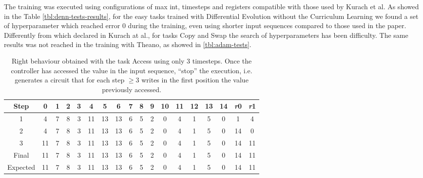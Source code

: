 \iffalse
\begin{figure}[t]
	\centering
	\begin{tikzpicture}[samples=100,smooth, scale=.875]
			\begin{axis}[
 				axis x line=center,
  				axis y line=center,
 				xlabel={Sequence A length},
  				ylabel={Error rate},
    				x label style={at={(axis description cs:0.5,-0.115)},anchor=north},
    				y label style={at={(axis description cs:-0.115,.5)},rotate=90,anchor=south},    				
			    grid=both,
			    grid style={line width=.1pt, draw=gray!10},
			    major grid style={line width=.2pt,draw=gray!50},
			    xtick={10, 20, 30 50, 100, 500, 1000},
			    xmin=0, xmax=1000,
			    ymin=0, ymax=1,
				legend style={at={(0.5,-0.25)},anchor=north}		
			]
  				\addplot table{data/swap-error-rate-CL.txt};
  				\addlegendentry{Swap CL}
			\end{axis}
	\end{tikzpicture}
	\label{fig:nram-tests-error-rate-plot}
	\caption{Error rate of best controllers in generalization tests.}
\end{figure}
\fi
The training was executed using configurations of max int, timesteps and registers compatible with those used by Kurach et al. As showed in the Table \ref{tbl:denn-tests-results}, for the easy tasks trained with Differential Evolution without the Curriculum Learning we found a set of hyperparameter which reached error 0 during the training, even using shorter input sequences compared to those used in the paper. Differently from which declared in Kurach at al., for tasks Copy and Swap the search of hyperparameters has been difficulty. The same results was not reached in the training with Theano, as showed in \ref{tbl:adam-tests}. 
\begin{table}[h]
	\centering
	\begin{tabular}{c|ccccccccccccccc|cc}
		\rowcolor{Gray}\textbf{Step} & 0 & 1 & 2 & 3 & 4 & 5 & 6 & 7 & 8 & 9 & 10 & 11 & 12 & 13 & 14 & \textit{r}0 & \textit{r}1 \\ \hline 
1 & 4 & 7 & 8 & 3 & 11 & 13 & 13 & 6 & 5 & 2 & 0 & 4 & 1 & 5 & 0 & 1 & 4 \\ 
2 & 4 & 7 & 8 & 3 & 11 & 13 & 13 & 6 & 5 & 2 & 0 & 4 & 1 & 5 & 0 & 14 & 0 \\ 
3 & 11 & 7 & 8 & 3 & 11 & 13 & 13 & 6 & 5 & 2 & 0 & 4 & 1 & 5 & 0 & 14 & 11 \\ \hline 
\rowcolor{Gray}Final & 11 & 7 & 8 & 3 & 11 & 13 & 13 & 6 & 5 & 2 & 0 & 4 & 1 & 5 & 0 & 14 & 11 \\
\rowcolor{Gray}Expected & 11 & 7 & 8 & 3 & 11 & 13 & 13 & 6 & 5 & 2 & 0 & 4 & 1 & 5 & 0 & 14 & 11 \\
	\end{tabular}
	\label{tbl:right-behaviour}
	\caption{Right behaviour obtained with the task Access using only 3 timesteps. Once the controller has accessed the value in the input sequence, ``stop'' the execution, i.e. generates a circuit that for each step $\geq 3$ writes in the first position the value previously accessed.}
\end{table}
